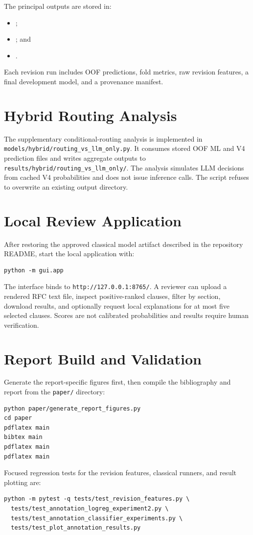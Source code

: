 \documentclass[12pt,a4paper,oneside]{report}
\begin{document}
The principal outputs are stored in:
\begin{itemize}[nosep]
    \item {};
    \item {}; and
    \item {}.
\end{itemize}
Each revision run includes OOF predictions, fold metrics, raw revision features, a final development model, and a provenance manifest.

\section{Hybrid Routing Analysis}

The supplementary conditional-routing analysis is implemented in \texttt{models/hybrid/routing\_vs\_llm\_only.py}. It consumes stored OOF ML and V4 prediction files and writes aggregate outputs to \texttt{results/hybrid/routing\_vs\_llm\_only/}. The analysis simulates LLM decisions from cached V4 probabilities and does not issue inference calls. The script refuses to overwrite an existing output directory.

\section{Local Review Application}

After restoring the approved classical model artifact described in the repository README, start the local application with:

\begin{verbatim}
python -m gui.app
\end{verbatim}

The interface binds to \texttt{http://127.0.0.1:8765/}. A reviewer can upload a rendered RFC text file, inspect positive-ranked clauses, filter by section, download results, and optionally request local explanations for at most five selected clauses. Scores are not calibrated probabilities and results require human verification.

\section{Report Build and Validation}

Generate the report-specific figures first, then compile the bibliography and report from the \texttt{paper/} directory:

\begin{verbatim}
python paper/generate_report_figures.py
cd paper
pdflatex main
bibtex main
pdflatex main
pdflatex main
\end{verbatim}

Focused regression tests for the revision features, classical runners, and result plotting are:

\begin{verbatim}
python -m pytest -q tests/test_revision_features.py \
  tests/test_annotation_logreg_experiment2.py \
  tests/test_annotation_classifier_experiments.py \
  tests/test_plot_annotation_results.py
\end{verbatim}
\end{document}
